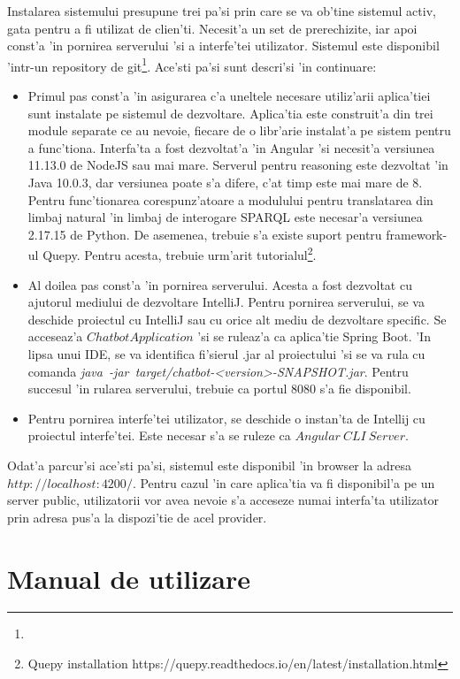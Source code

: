 \documentclass[12pt,a4paper,twoside]{report}
\begin{document}
Instalarea sistemului presupune trei pa'si prin care se va ob'tine sistemul activ, gata pentru a fi utilizat de clien'ti. Necesit'a un set de prerechizite, iar apoi const'a 'in pornirea serverului 'si a interfe'tei utilizator. Sistemul este disponibil 'intr-un repository de git\footnote{ }. Ace'sti pa'si sunt descri'si 'in continuare:

\begin{itemize}
    \item Primul pas const'a 'in asigurarea c'a uneltele necesare utiliz'arii aplica'tiei sunt instalate pe sistemul de dezvoltare. Aplica'tia este construit'a din trei module separate ce au nevoie, fiecare de o libr'arie instalat'a pe sistem pentru a func'tiona. Interfa'ta a fost dezvoltat'a 'in Angular 'si necesit'a versiunea 11.13.0 de NodeJS sau mai mare. Serverul pentru reasoning este dezvoltat 'in Java 10.0.3, dar versiunea poate s'a difere, c'at timp este mai mare de 8. Pentru func'tionarea corespunz'atoare a modulului pentru translatarea din limbaj natural 'in limbaj de interogare SPARQL este necesar'a versiunea 2.17.15 de Python. De asemenea, trebuie s'a existe suport pentru framework-ul Quepy. Pentru acesta, trebuie urm'arit tutorialul\footnote{Quepy installation https://quepy.readthedocs.io/en/latest/installation.html}.
    \item Al doilea pas const'a 'in pornirea serverului. Acesta a fost dezvoltat cu ajutorul mediului de dezvoltare IntelliJ. Pentru pornirea serverului, se va deschide proiectul cu IntelliJ sau cu orice alt mediu de dezvoltare specific. Se acceseaz'a $ChatbotApplication$ 'si se ruleaz'a ca aplica'tie Spring Boot. 'In lipsa unui IDE, se va identifica fi'sierul .jar al proiectului 'si se va rula cu comanda {\it java\ -jar\ target/chatbot-<version>-SNAPSHOT.jar}. Pentru succesul 'in rularea serverului, trebuie ca portul 8080 s'a fie disponibil.
    \item Pentru pornirea interfe'tei utilizator, se deschide o instan'ta de Intellij cu proiectul interfe'tei. Este necesar s'a se ruleze ca $Angular\ CLI\ Server$. 
\end{itemize}

Odat'a parcur'si ace'sti pa'si, sistemul este disponibil 'in browser la adresa $http://localhost:4200/$. Pentru cazul 'in care aplica'tia va fi disponibil'a pe un server public, utilizatorii vor avea nevoie s'a acceseze numai interfa'ta utilizator prin adresa pus'a la dispozi'tie de acel provider.

\section{Manual de utilizare}
\end{document}
